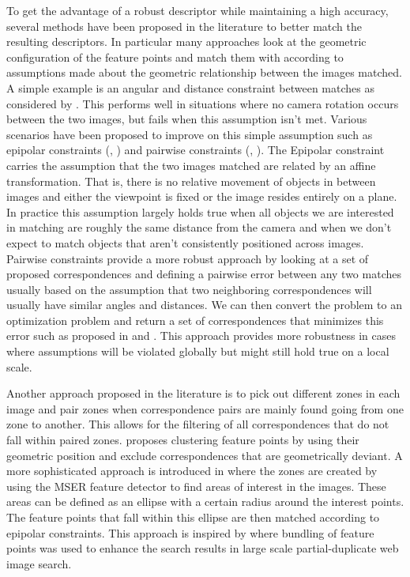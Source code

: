 \documentclass{article}
\begin{document}
To get the advantage of a robust descriptor while maintaining a high 
accuracy, several methods have been proposed in the literature to better 
match the resulting descriptors.  In particular many approaches look at 
the geometric configuration of the feature points and match them with 
according to assumptions made about the geometric relationship between 
the images matched. A simple example is an angular and distance 
constraint between matches as considered by \cite{kim2008efficient}.  
This performs well in situations where no camera rotation occurs between 
the two images, but fails when this assumption isn't met. Various 
scenarios have been proposed to improve on this simple assumption such 
as epipolar constraints (\cite{torr2000mlesac}, \cite{chum2005matching}) 
and pairwise constraints (\cite{choi2009robust}, 
\cite{leordeanu2005spectral}). The Epipolar constraint carries the 
assumption that the two images matched are related by an affine 
transformation. That is, there is no relative movement of objects in 
between images and either the viewpoint is fixed or the image resides 
entirely on a plane. In practice this assumption largely holds true when 
all objects we are interested in matching are roughly the same distance 
from the camera and when we don't expect to match objects that aren't 
consistently positioned across images.  Pairwise constraints provide a 
more robust approach by looking at a set of proposed correspondences and 
defining a pairwise error between any two matches usually based on the 
assumption that two neighboring correspondences will usually have 
similar angles and distances. We can then convert the problem to an 
optimization problem and return a set of correspondences that minimizes 
this error such as proposed in \cite{choi2009robust} and 
\cite{leordeanu2005spectral}. This approach provides more robustness in 
cases where assumptions will be violated globally but might still hold 
true on a local scale.

Another approach proposed in the literature is to pick out different 
zones in each image and pair zones when correspondence pairs are mainly 
found going from one zone to another. This allows for the filtering of 
all correspondences that do not fall within paired zones.  
\cite{das2008event} proposes clustering feature points by using their 
geometric position and exclude correspondences that are geometrically 
deviant. A more sophisticated approach is introduced in 
\cite{wu2011robust} where the zones are created by using the MSER 
feature detector to find areas of interest in the images. These areas 
can be defined as an ellipse with a certain radius around the interest 
points. The feature points that fall within this ellipse are then 
matched according to epipolar constraints. This approach is inspired by 
\cite{wu2009bundling} where bundling of feature points was used to 
enhance the search results in large scale partial-duplicate web image 
search.
\end{document}
